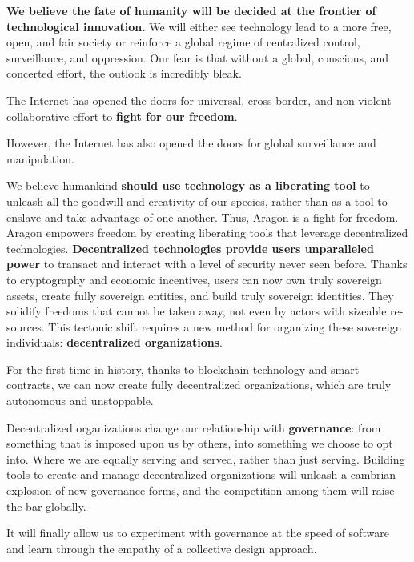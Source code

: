 
\label{chap:AragonManifesto}

\textbf{We believe the fate of humanity will be decided at the frontier of technological innovation.} 
We will either see technology lead to a more free, open, and fair society or reinforce a global regime of centralized control, surveillance, and oppression. Our fear is that without a global, conscious, and concerted effort, the outlook is incredibly bleak.

The Internet has opened the doors for universal, cross-border, and non-violent collaborative effort to \textbf{fight for our freedom}.

However, the Internet has also opened the doors for global surveillance and manipulation.

We believe humankind \textbf{should use technology as a liberating tool} to unleash all the goodwill and creativity of our species, rather than as a tool to enslave and take advantage of one another.
Thus, Aragon is a fight for freedom. Aragon empowers freedom by creating liberating tools that leverage decentralized technologies.
\textbf{Decentralized technologies provide users unparalleled power} to transact and interact with a level of security never seen before. Thanks to cryptography and economic incentives, users can now own truly sovereign assets, create fully sovereign entities, and build truly sovereign identities. They solidify freedoms that cannot be taken away, not even by actors with sizeable re- sources. This tectonic shift requires a new method for organizing these sovereign individuals: \textbf{decentralized organizations}.

For the first time in history, thanks to blockchain technology and smart contracts, we can now create fully decentralized organizations, which are truly autonomous and unstoppable.

Decentralized organizations change our relationship with \textbf{governance}: from something that is imposed upon us by others, into something we choose to opt into. 
Where we are equally serving and served, rather than just serving.
Building tools to create and manage decentralized organizations will unleash a cambrian explosion of new governance forms, and the competition among them will raise the bar globally.

It will finally allow us to experiment with governance at the speed of software and learn through the empathy of a collective design approach.


